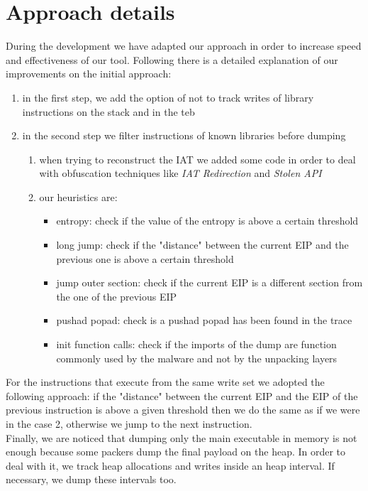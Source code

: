 \section{Approach details}
During the development we have adapted our approach in order to increase speed and effectiveness of our tool. Following there is a detailed explanation of our improvements on the initial approach:
\begin{enumerate}
\item in the first step, we add the option of not to track writes of library instructions on the stack and in the teb
\item in the second step we filter instructions of known libraries before dumping
	\begin{enumerate}
	\item when trying to reconstruct the IAT we added some code in order to deal with 			obfuscation techniques like \textit{IAT Redirection} and \textit{Stolen API}
	\item our heuristics are:
		\begin{itemize}
		\item entropy: check if the value of the entropy is above a certain threshold
		\item long jump: check if the "distance" between the current EIP and the previous 			one is above a certain threshold
		\item jump outer section: check if the current EIP is a different section from the 		one of the previous EIP
		\item pushad popad: check is a pushad popad has been found in the trace
		\item init function calls: check if the imports of the dump are function commonly 			 used by the malware and not by the unpacking layers
		\end{itemize}
	\end{enumerate}
\end{enumerate} 
For the instructions that execute from the same write set we adopted the following approach: if the "distance" between the current EIP and the EIP of the previous instruction is above a given threshold then we do the same as if we were in the case 2, otherwise we jump to the next instruction.\\
Finally, we are noticed that dumping only the main executable in memory is not enough because some packers dump the final payload on the heap. In order to deal with it, we track heap allocations and writes inside an heap interval. If necessary, we dump these intervals too.
